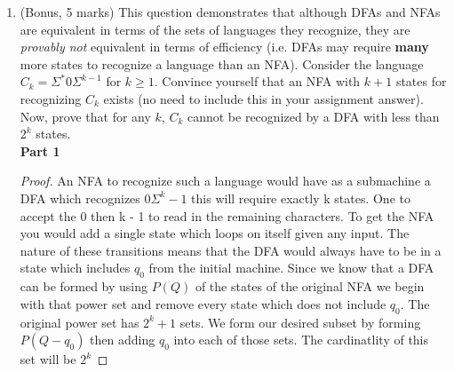 \documentclass{article}
\begin{document}
\begin{enumerate}
    \item (Bonus, 5 marks) This question demonstrates that although DFAs and NFAs are equivalent in terms of the sets of languages they recognize, they are \emph{provably not} equivalent in terms of efficiency (i.e. DFAs may require \textbf{many} more states to recognize a language than an NFA). Consider the language $C_k=\Sigma^* 0 \Sigma^{k-1}$ for $k\geq 1$. Convince yourself that an NFA with $k+1$ states for recognizing $C_k$ exists (no need to include this in your assignment answer). Now, prove that for any $k$, $C_k$ cannot be recognized by a DFA with less than $2^k$ states.\\
\textbf{Part 1}
\begin{proof} An NFA to recognize such a language would have as a submachine a DFA which recognizes $0\Sigma^k-1$ this will require exactly k states. One to accept the 0 then k - 1 to read in the remaining characters. To get the NFA you would add a single state which loops on itself given any input. The nature of these transitions means that the DFA would always have to be in a state which includes $q_0$ from the initial machine. Since we know that a DFA can be formed by using $P(Q)$ of the states of the original NFA we begin with that power set and remove every state which does not include $q_0$. The original power set has $2^k+1$ sets. We form our desired subset by forming $P(Q-{q_0})$ then adding $q_0$ into each of those sets. The cardinatlity of this set will be $2^k$  
\end{proof}
\end{enumerate}
\end{document}
